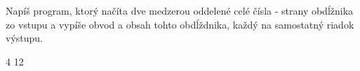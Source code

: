 




Napíš program, ktorý načíta dve medzerou oddelené celé čísla - strany obdĺžnika zo vstupu a vypíše
obvod a obsah tohto obdĺždnika, každý na samostatný riadok výstupu.

 4
12
\koniec



